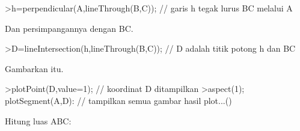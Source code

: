 \documentclass[a4paper,10pt]{article}
\begin{document}
\begin{eulernotebook}
\begin{eulercomment}
\begin{eulercomment}
\begin{eulercomment}
\begin{eulercomment}
\begin{eulercomment}
\begin{eulercomment}
\begin{eulercomment}
\begin{eulercomment}
\begin{eulercomment}
\begin{eulercomment}
\begin{eulercomment}
\begin{eulercomment}
\begin{eulercomment}
\begin{eulercomment}
\begin{eulercomment}
\begin{eulercomment}
\begin{eulercomment}
\begin{eulercomment}
\begin{eulercomment}
\begin{eulercomment}
\begin{eulercomment}
\begin{eulercomment}
\begin{eulercomment}
\begin{eulercomment}
\begin{eulercomment}
\begin{eulercomment}
\begin{eulercomment}
\begin{eulercomment}
\begin{eulercomment}
\begin{eulercomment}
\begin{eulercomment}
\end{eulercomment}
\begin{eulerprompt}
>h=perpendicular(A,lineThrough(B,C)); // garis h tegak lurus BC melalui A
\end{eulerprompt}
\begin{eulercomment}
Dan persimpangannya dengan BC.
\end{eulercomment}
\begin{eulerprompt}
>D=lineIntersection(h,lineThrough(B,C)); // D adalah titik potong h dan BC
\end{eulerprompt}
\begin{eulercomment}
Gambarkan itu.
\end{eulercomment}
\begin{eulerprompt}
>plotPoint(D,value=1); // koordinat D ditampilkan
>aspect(1); plotSegment(A,D): // tampilkan semua gambar hasil plot...()
\end{eulerprompt}
\begin{eulercomment}
Hitung luas ABC:


\end{eulercomment}
\end{eulercomment}
\end{eulercomment}
\end{eulercomment}
\end{eulercomment}
\end{eulercomment}
\end{eulercomment}
\end{eulercomment}
\end{eulercomment}
\end{eulercomment}
\end{eulercomment}
\end{eulercomment}
\end{eulercomment}
\end{eulercomment}
\end{eulercomment}
\end{eulercomment}
\end{eulercomment}
\end{eulercomment}
\end{eulercomment}
\end{eulercomment}
\end{eulercomment}
\end{eulercomment}
\end{eulercomment}
\end{eulercomment}
\end{eulercomment}
\end{eulercomment}
\end{eulercomment}
\end{eulercomment}
\end{eulercomment}
\end{eulercomment}
\end{eulercomment}
\end{eulernotebook}
\end{document}
